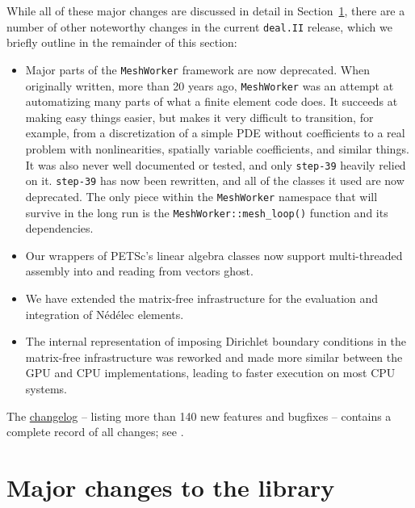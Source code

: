 \documentclass{ansarticle-preprint}
\newcommand{\specialword}[1]{\texttt{#1}}
\newcommand{\dealii}{{\specialword{deal.II}}\xspace}
\newcommand{\step}[1]{{\specialword{step-#1}}\xspace}
\begin{document}
While all of these major changes are discussed in detail in
Section~\ref{sec:major}, there
are a number of other noteworthy changes in the current \dealii release,
which we briefly outline in the remainder of this section:
%
\begin{itemize}
\item Major parts of the \texttt{MeshWorker} framework are now
  deprecated. When originally written, more than 20 years ago,
  \texttt{MeshWorker} was an attempt at automatizing many parts of
  what a finite element code does. It succeeds at making easy things
  easier, but makes it very difficult to transition, for example, from a
  discretization of a simple PDE without coefficients to a real
  problem with nonlinearities, spatially variable coefficients, and
  similar things. It was also never well documented or tested, and
  only \step{39} heavily relied on it. \step{39} has now been rewritten,
  and all of the classes it used are now deprecated. The only piece
  within the \texttt{MeshWorker} namespace that will survive in the
  long run is the \texttt{MeshWorker::mesh\_loop()} function and its
  dependencies.
\item Our wrappers of PETSc's linear algebra classes now support multi-threaded assembly into and reading from vectors ghost.
\item We have extended the matrix-free infrastructure for the
  evaluation and integration of N{\'e}d{\'e}lec elements.
\item The internal representation of imposing Dirichlet boundary conditions in
  the matrix-free infrastructure was reworked and made more similar between
  the GPU and CPU implementations, leading to faster execution on most CPU
  systems.
\end{itemize}
%
The
\href{https://dealii.org/developer/doxygen/deal.II/changes_between_9_7_1_and_9_8_0.html}{changelog}
-- listing more than 140
new features and bugfixes --
contains a complete record of all changes; see \cite{changes98}.



\section{Major changes to the library}
\label{sec:major}
\end{document}
